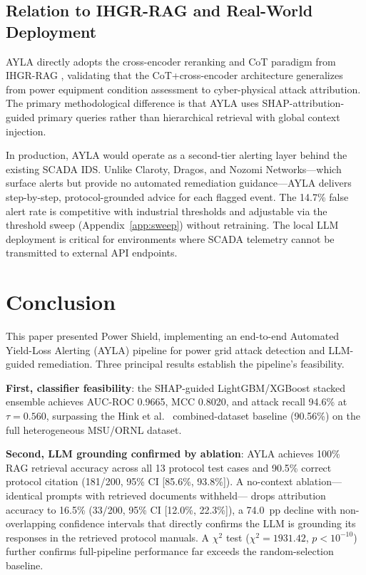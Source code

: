 \documentclass[twocolumn, 10pt, letterpaper]{article}
\begin{document}
\subsection{Relation to IHGR-RAG and Real-World Deployment}

AYLA directly adopts the cross-encoder reranking and CoT paradigm from
IHGR-RAG \cite{ihgrrag2025}, validating that the CoT+cross-encoder architecture
generalizes from power equipment condition assessment to cyber-physical attack
attribution.
The primary methodological difference is that AYLA uses SHAP-attribution-guided
primary queries rather than hierarchical retrieval with global context injection.

In production, AYLA would operate as a second-tier alerting layer behind the
existing SCADA IDS.
Unlike Claroty, Dragos, and Nozomi Networks---which surface alerts but provide
no automated remediation guidance---AYLA delivers step-by-step, protocol-grounded
advice for each flagged event.
The 14.7\% false alert rate is competitive with industrial thresholds and
adjustable via the threshold sweep (Appendix~\ref{app:sweep}) without retraining.
The local LLM deployment is critical for environments where SCADA telemetry
cannot be transmitted to external API endpoints.

\section{Conclusion}
\label{sec:conclusion}

This paper presented Power Shield, implementing an end-to-end
Automated Yield-Loss Alerting (AYLA) pipeline for power grid attack detection
and LLM-guided remediation.
Three principal results establish the pipeline's feasibility.

\textbf{First, classifier feasibility}: the SHAP-guided LightGBM/XGBoost stacked
ensemble achieves AUC-ROC 0.9665, MCC 0.8020, and attack recall 94.6\% at
$\tau{=}0.560$, surpassing the Hink et al.\ \cite{hink2014ml} combined-dataset
baseline (90.56\%) on the full heterogeneous MSU/ORNL dataset.

\textbf{Second, LLM grounding confirmed by ablation}: AYLA achieves 100\%
RAG retrieval accuracy across all 13 protocol test cases and 90.5\% correct
protocol citation (181/200, 95\% CI [85.6\%, 93.8\%]).
A no-context ablation---identical prompts with retrieved documents withheld---
drops attribution accuracy to 16.5\% (33/200, 95\% CI [12.0\%, 22.3\%]),
a 74.0~pp decline with non-overlapping confidence intervals that directly
confirms the LLM is grounding its responses in the retrieved protocol manuals.
A $\chi^2$ test ($\chi^2 = 1931.42$, $p < 10^{-10}$) further confirms
full-pipeline performance far exceeds the random-selection baseline.
\end{document}
